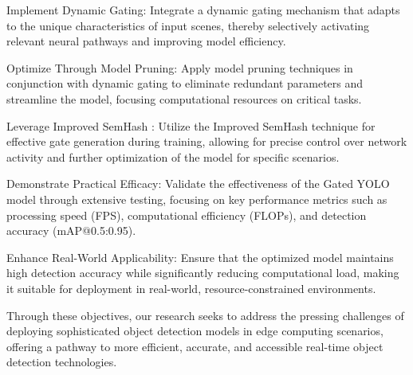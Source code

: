 Implement Dynamic Gating: Integrate a dynamic gating mechanism that adapts to the unique characteristics of input scenes, thereby selectively activating relevant neural pathways and improving model efficiency.

Optimize Through Model Pruning: Apply model pruning techniques in conjunction with dynamic gating to eliminate redundant parameters and streamline the model, focusing computational resources on critical tasks.

Leverage Improved SemHash \cite*{kaiser2018discrete}: Utilize the Improved SemHash technique for effective gate generation during training, allowing for precise control over network activity and further optimization of the model for specific scenarios.

Demonstrate Practical Efficacy: Validate the effectiveness of the Gated YOLO model through extensive testing, focusing on key performance metrics such as processing speed (FPS), computational efficiency (FLOPs), and detection accuracy (mAP@0.5:0.95).

Enhance Real-World Applicability: Ensure that the optimized model maintains high detection accuracy while significantly reducing computational load, making it suitable for deployment in real-world, resource-constrained environments.

Through these objectives, our research seeks to address the pressing challenges of deploying sophisticated object detection models in edge computing scenarios, offering a pathway to more efficient, accurate, and accessible real-time object detection technologies.

\clearpage

